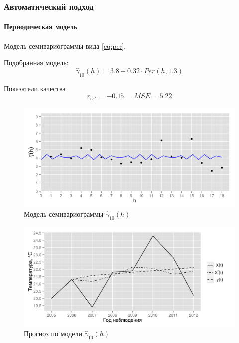 \documentclass{beamer}
\begin{document}
\begin{frame}
  \frametitle{Автоматический подход}
  \framesubtitle{Периодическая модель}
  \begin{multicols}{2}
  Модель семивариограммы вида \eqref{eq:per}.

  \medskip

  Подобранная модель:
  \begin{equation}
  \label{eq:gamma10}
    \widehat{\gamma}_{10}(h) = 3.8 + 0.32 \cdot Per(h, 1.3)
  \end{equation}

  Показатели качества
  \begin{equation*}
    r_{\varepsilon\varepsilon^{*}} = -0.15, \quad MSE = 5.22
  \end{equation*}

  \columnbreak
  \vspace{-14.5pt}
  \begin{figure}[H]
    \includegraphics[width=0.9\linewidth]{../../figures/variogram/auto-class-18-modeled.png} \\
    \caption{Модель семивариограммы $\widehat{\gamma}_{10}(h)$}
    \includegraphics[width=0.9\linewidth]{../../figures/variogram/auto-class-18-cross-prediction.png}
    \caption{Прогноз по модели $\widehat{\gamma}_{10}(h)$}
  \end{figure}
  \end{multicols}
\end{frame}
\end{document}
